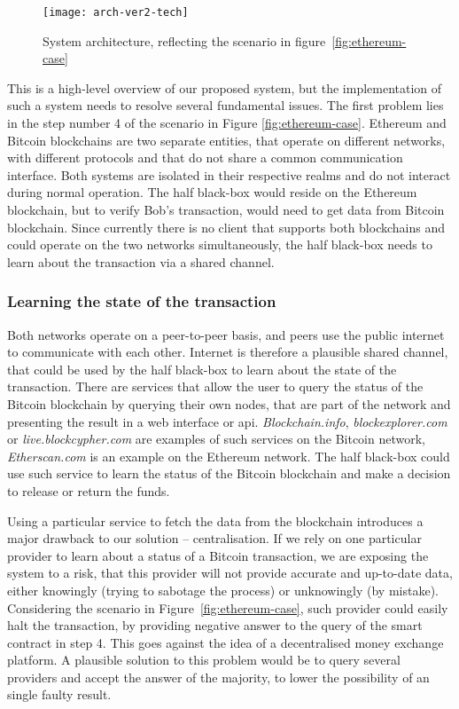 \begin{figure}[ht]
    \centering
    \texttt{[image: arch-ver2-tech]}
    \caption{System architecture, reflecting the scenario in figure~\ref{fig:ethereum-case}}
    \label{fig:arch-ver2-tech}
\end{figure}

This is a high-level overview of our proposed system, but the implementation of such a system needs to resolve several fundamental issues. The first problem lies in the step number 4 of the scenario in Figure \ref{fig:ethereum-case}. Ethereum and Bitcoin blockchains are two separate entities, that operate on different networks, with different protocols and that do not share a common communication interface. Both systems are isolated in their respective realms and do not interact during normal operation\footnotemark. The half black-box would reside on the Ethereum blockchain, but to verify Bob’s transaction, would need to get data from Bitcoin blockchain. Since currently there is no client that supports both blockchains and could operate on the two networks simultaneously, the half black-box needs to learn about the transaction via a shared channel.
% 

\subsubsection{Learning the state of the transaction}
Both networks operate on a peer-to-peer basis, and peers use the public internet to communicate with each other. Internet is therefore a plausible shared channel, that could be used by the half black-box to learn about the state of the transaction. There are services that allow the user to query the status of the Bitcoin blockchain by querying their own nodes, that are part of the network and presenting the result in a web interface or \acrshort{api}. \textit{Blockchain.info}, \textit{blockexplorer.com} or \textit{live.blockcypher.com} are examples of such services on the Bitcoin network, \textit{Etherscan.com} is an example on the Ethereum network. The half black-box could use such service to learn the status of the Bitcoin blockchain and make a decision to release or return the funds.

Using a particular service to fetch the data from the blockchain introduces a major drawback to our solution -- centralisation. If we rely on one particular provider to learn about a status of a Bitcoin transaction, we are exposing the system to a risk, that this provider will not provide accurate and up-to-date data, either knowingly (trying to sabotage the process) or unknowingly (by mistake). Considering the scenario in Figure~\ref{fig:ethereum-case}, such provider could easily halt the transaction, by providing negative answer to the query of the smart contract in step 4. This goes against the idea of a decentralised money exchange platform. A plausible solution to this problem would be to query several providers and accept the answer of the majority, to lower the possibility of an single faulty result.

